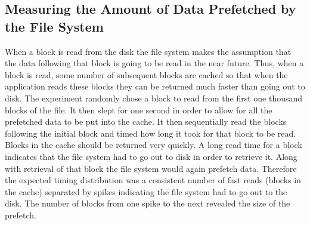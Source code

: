 \documentclass[letterpaper,twocolumn,10pt]{article}
\begin{document}
\subsection{Measuring the Amount of Data Prefetched by the File System}
When a block is read from the disk the file system makes the assumption that the data following that block is going to be read in the near future. 
Thus, when a block is read, some number of subsequent blocks are cached so that when the application reads these blocks they can be returned much faster than going out to disk. 
The experiment randomly chose a block to read from the first one thousand blocks of the file. 
It then slept for one second in order to allow for all the prefetched data to be put into the cache. 
It then sequentially read the blocks following the initial block and timed how long it took for that block to be read. 
Blocks in the cache should be returned very quickly. 
A long read time for a block indicates that the file system had to go out to disk in order to retrieve it. 
Along with retrieval of that block the file system would again prefetch data. 
Therefore the expected timing distribution was a consistent number of fast reads (blocks in the cache) separated by spikes indicating the file system had to go out to the disk. 
The number of blocks from one spike to the next revealed the size of the prefetch.
\end{document}

